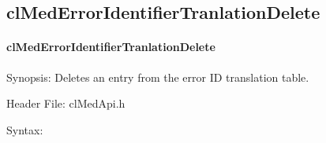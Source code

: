 \begin{flushleft}
\subsection{clMedErrorIdentifierTranlationDelete}
\hypertarget{pagemed109}{}\paragraph{cl\-Med\-Error\-Identifier\-Tranlation\-Delete}\label{pagemed109}
\begin{Desc}
\item[Synopsis:]Deletes an entry from the error ID translation table.\end{Desc}
\begin{Desc}
\item[Header File:]clMedApi.h\end{Desc}
\begin{Desc}
\item[Syntax:]


\end{Desc}
\end{flushleft}
